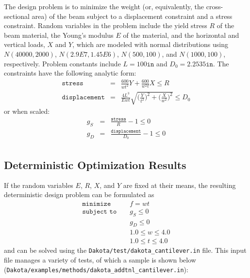 The design problem is to minimize the weight (or, equivalently, the
cross-sectional area) of the beam subject to a displacement constraint
and a stress constraint. Random variables in the problem include the
yield stress $R$ of the beam material, the Young's modulus $E$ of the
material, and the horizontal and vertical loads, $X$ and $Y$, which
are modeled with normal distributions using $N(40000, 2000)$,
$N(2.9E7, 1.45E6)$, $N(500, 100)$, and $N(1000, 100)$, respectively.
Problem constants include $L = 100\mathtt{in}$ and $D_{0} = 2.2535
\mathtt{in}$. The constraints have the following analytic form:
\begin{eqnarray}
\mathtt{stress}&=&\frac{600}{w t^2}Y+\frac{600}{w^2t}X \leq R
  \label{additional:cant}\\
\mathtt{displacement}&=&\frac{4L^3}{E w t}
  \sqrt{\bigg(\frac{Y}{t^2}\bigg)^2+\bigg(\frac{X}{w^2}\bigg)^2}
  \leq D_{0} \nonumber
\end{eqnarray}
or when scaled:
\begin{eqnarray}
  g_{S}&=&\frac{\mathtt{stress}}{R}-1 \leq 0\label{additional:cantscale}\\
  g_{D}&=&\frac{\mathtt{displacement}}{D_{0}}-1 \leq 0\nonumber\\
\end{eqnarray}

\subsection{Deterministic Optimization Results}\label{additional:cantilever:deterministic}

If the random variables $E$, $R$, $X$, and $Y$ are fixed at their
means, the resulting deterministic design problem can be formulated as
\begin{eqnarray}
\texttt{minimize }   & & f = w t            \nonumber\\
\texttt{subject to } & & g_{S} \leq 0 \label{additional:cantopt}\\
                     & & g_{D} \leq 0       \nonumber\\
                     & & 1.0 \leq w \leq 4.0\nonumber\\
                     & & 1.0 \leq t \leq 4.0\nonumber
\end{eqnarray}
and can be solved using the \texttt{Dakota/test/dakota\_cantilever.in}
file. This input file manages a variety of tests, of which a sample is
shown below \\
(\texttt{Dakota/examples/methods/dakota\_addtnl\_cantilever.in}):
\begin{center}
  \begin{small}
    \begin{bigbox}
    \end{bigbox}
  \end{small}
\end{center}

